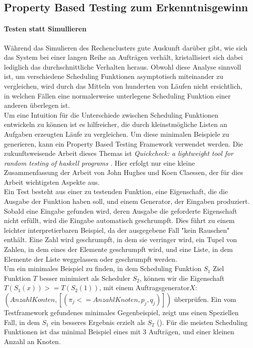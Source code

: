 \FloatBarrier
\subsection{Property Based Testing zum Erkenntnisgewinn}
\label{proptest}
\paragraph{Testen statt Simullieren}
Während das Simulieren des Rechenclusters gute Auskunft darüber gibt, wie sich das System bei einer langen Reihe an Aufträgen verhält, kristallisiert sich dabei lediglich das durchschnittliche Verhalten heraus. Obwohl diese Analyse sinnvoll ist, um verschiedene Scheduling Funktionen asymptotisch miteinander zu vergleichen, wird durch das Mitteln von hunderten von Läufen nicht ersichtlich, in welchen Fällen eine normalerweise unterlegene Scheduling Funktion einer anderen überlegen ist.\\
Um eine Intuition für die Unterschiede zwischen Scheduling Funktionen entwickeln zu können ist es hilfreicher, die durch kleinstmögliche Listen an Aufgaben erzeugten Läufe zu vergleichen. Um diese minimalen Beispiele zu generieren, kann ein Property Based Testing Framework verwendet werden. Die zukunftsweisende Arbeit dieses Themas ist \emph{Quickcheck: a lightweight tool for random testing of haskell programs} \cite{hughes2000quickcheck}. Hier erfolgt nur eine kleine Zusammenfassung der Arbeit von John Hughes und Koen Claessen, der für dies Arbeit wichtigsten Aspekte aus. \\
Ein Test besteht aus einer zu testenden Funktion, eine Eigenschaft, die die Ausgabe der Funktion haben soll, und einem Generator, der Eingaben produziert. Sobald eine Eingabe gefunden wird, deren Ausgabe die geforderte Eigenschaft nicht erfüllt, wird die Eingabe automatisch geschrumpft. Dies führt zu einem leichter interpretierbaren Beispiel, da der ausgegebene Fall "kein Rauschen" enthält.
Eine Zahl wird geschrumpft, in dem sie verringer wird, ein Tupel von Zahlen, in dem eines der Elemente geschrumpft wird, und eine Liste, in dem Elemente der Liste weggelassen oder geschrumpft werden.\\

Um ein minimales Beispiel zu finden, in dem Scheduling Funktion $S_1$ Ziel Funktion $T$ besser minimiert als Scheduler $S_2$, können wir die Eigenschaft $T(S_1(x)) >= T (S_2(1))$, mit einem Auftragsgenerator$X$: $(Anzahl Konten,[(\pi_j <= Anzahl Knoten,p_j,q_j)])$ überprüfen.
Ein vom Testframework gefundenes minimales Gegenbeispiel, zeigt uns einen Speziellen Fall, in dem $S_1$ ein besseres Ergebnis erzielt als $S_2$ (\cite{TestOpt}).
Für die meisten Scheduling Funktionen ist das minimal Beispiel eines mit 3 Aufträgen, und einer kleinen Anzahl an Knoten.

